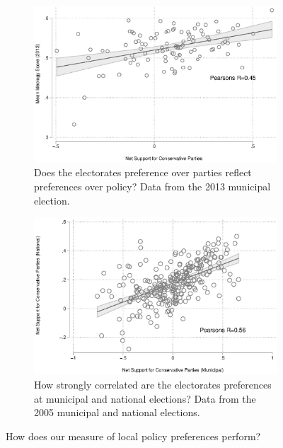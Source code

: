 \documentclass[a4paper,12pt]{article}
\begin{document}
\begin{figure}
	\begin{subfigure}{0.45\textwidth}
	\includegraphics[width=1\textwidth]{validation.eps}
	\caption{Does the electorates preference over parties reflect preferences over policy? Data from the 2013 municipal election.} \label{validation1}
	\end{subfigure}  \hfill
	\begin{subfigure}{0.45\textwidth}
	\includegraphics[width=1\textwidth]{validation2.eps}
	\caption{How strongly correlated are the electorates preferences at municipal and national elections? Data from the 2005 municipal and national elections.} \label{validation2}
\end{subfigure}
\caption{How does our measure of local policy preferences perform?}
\end{figure}
\end{document}
